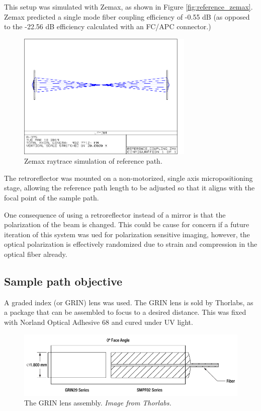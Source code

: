 This setup was simulated with Zemax, as shown in Figure \ref{fig:reference_zemax}. Zemax predicted a single mode fiber coupling efficiency of -0.55 dB (as opposed to the -22.56 dB efficiency calculated with an FC/APC connector.)

\begin{figure}[h!]
\centering
\includegraphics[width=0.75\textwidth]{Images/Zemax/RP-raytrace.png}
\caption{Zemax raytrace simulation of reference path.}
\end{figure}

The retroreflector was mounted on a non-motorized, single axis micropositioning stage, allowing the reference path length to be adjusted so that it aligns with the focal point of the sample path.

One consequence of using a retroreflector instead of a mirror is that the polarization of the beam is changed. This could be cause for concern if a future iteration of this system was ued for polarization sensitive imaging, however, the optical polarization is effectively randomized due to strain and compression in the optical fiber already.

\subsection{Sample path objective}

A graded index (or GRIN) lens was used. The GRIN lens is sold by Thorlabs, as a package that can be assembled to focus to a desired distance. This was fixed with Norland Optical Adhesive 68 and cured under UV light.

\begin{figure}[h!]
\centering
\includegraphics[width=1.0\textwidth]{Images/System/grin.png}
\caption{The GRIN lens assembly. \em{Image from Thorlabs.}}
\end{figure}

